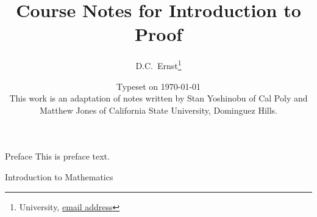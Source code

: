 \documentclass[letterpaper,11pt,onesided]{book}%
\theoremstyle{definition}
\let\origdoublepage\cleardoublepage
\newcommand{\clearemptydoublepage}{%
  \clearpage
  {\pagestyle{empty}\origdoublepage}%
}
\begin{document}
\frontmatter
\title{Course Notes for Introduction to Proof}
\author{D.C.~Ernst\thanks{University, \url{email address}}}
\date{Typeset on \today\\
\vfill
  This work is an adaptation of notes written by Stan Yoshinobu of Cal Poly and Matthew Jones of California State University, Dominguez Hills.
\vfill}
\maketitle
 \thispagestyle{empty}










\tableofcontents
\clearemptydoublepage

\begin{chapter}{Preface}
This is preface text.
\end{chapter}

\clearemptydoublepage

\mainmatter

\begin{chapter}{Introduction to Mathematics}






\end{chapter}
\end{document}
